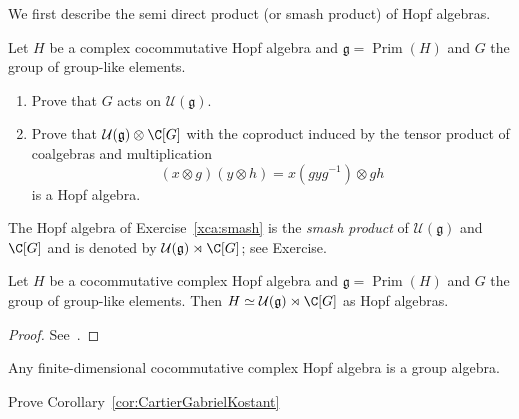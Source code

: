 \documentclass[12pt]{amsproc}
\begin{document}
We first describe 
the semi direct product (or smash product) 
of Hopf algebras. 


\begin{exercise}
\label{xca:smash}
Let $H$ be a complex cocommutative Hopf algebra and 
$\mathfrak{g}=\operatorname{Prim}(H)$ and 
$G$ the group 
of group-like elements.  
\begin{enumerate}
    \item Prove that $G$ acts on $\mathcal{U}(\mathfrak{g})$.    
    \item Prove that $\mathcal{U}(\mathfrak{g})\otimes\C[G]$ 
    with the coproduct induced by the tensor product of 
    coalgebras and multiplication
    \[
    (x\otimes g)(y\otimes h)=x(gyg^{-1})\otimes gh
    \]
    is a Hopf algebra. 
\end{enumerate}
\end{exercise}

The Hopf algebra of Exercise~\ref{xca:smash} is 
the \emph{smash product} of 
$\mathcal{U}(\mathfrak{g})$ and $\C[G]$
and is denoted by $\mathcal{U}(\mathfrak{g})\rtimes\C[G]$; see Exercise.%

\begin{theorem}
    \label{thm:CartierGabrielKostant}
    Let $H$ be a cocommutative complex Hopf algebra 
    and $\mathfrak{g}=\operatorname{Prim}(H)$ and $G$ 
    the group of group-like elements. Then 
    $H\simeq\mathcal{U}(\mathfrak{g})\rtimes\C[G]$ as 
    Hopf algebras. 
\end{theorem}

\begin{proof}
    See~\cite[Theorem 4.5.1]{zbMATH07372929}. 
\end{proof}


\begin{corollary}
\label{cor:CartierGabrielKostant}
    Any finite-dimensional cocommutative complex Hopf algebra
    is a group algebra. 
\end{corollary}

\begin{exercise}
    Prove Corollary~\ref{cor:CartierGabrielKostant}
\end{exercise}
\end{document}
